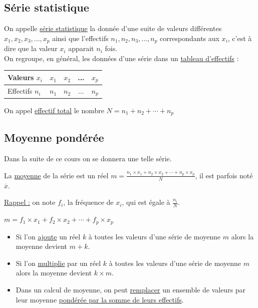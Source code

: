 \documentclass[french]{book}
\begin{document}
\subsection{Série statistique}
\begin{defn}
On appelle \underline{série statistique} la donnée d'une suite de valeurs différentes $x_1,x_2,x_3,...,x_p$ ainsi que l'effectifs $n_1,n_2,n_3,...,n_p$ correspondants aux $x_i$, c'est à dire que la valeur $x_i$ apparait $n_i$ fois.\\

On regroupe, en général, les données d'une série dans un \underline{tableau d'effectifs} :\\

\begin{center}


\begin{tabular}{|l|c|c|c|c|}
  \hline
  Valeurs $x_i$ & $x_1$ & $x_2$ & ... & $x_p$ \\
  \hline
 Effectifs $n_i$ & $n_1$ & $n_2$ & ... & $n_p$ \\
  \hline
\end{tabular} 
\end{center}
On appel \underline{effectif total} le nombre $N=n_1+n_2+ \cdots + n_p$
\end{defn}

\subsection{Moyenne pondérée}
Dans la suite de ce cours on se donnera une telle série.

\begin{defn}
La \underline{moyenne} de la série est un réel $m=\frac{n_1\times x_1 + n_2 \times x_2 + \cdots + n_p \times x_p }{N}$, il est parfois noté $\overline{x}$.
\end{defn}

\underline{Rappel :} on note $f_i$, la fréquence de $x_i$, qui est égale à $\frac{n_i}{N}$.

\begin{prop}
$m=f_1 \times x_1 + f_2 \times x_2 + \cdots +f_p \times x_p$
\end{prop}


\begin{prop}
\begin{itemize}
\item[1)] Si l'on \underline{ajoute} un réel $k$ à toutes les valeurs d'une série de moyenne $m$ alors la moyenne devient $m+k$.
\item[2)] Si l'on \underline{multiplie} par un réel $k$ à toutes les valeurs d'une série de moyenne $m$ alors la moyenne devient $k \times m$.
\item[3)] Dans un calcul de moyenne, on peut \underline{remplacer} un ensemble de valeurs par leur moyenne \underline{pondérée par la somme de leurs effectifs}.

\end{itemize}
\end{prop}
\end{document}
